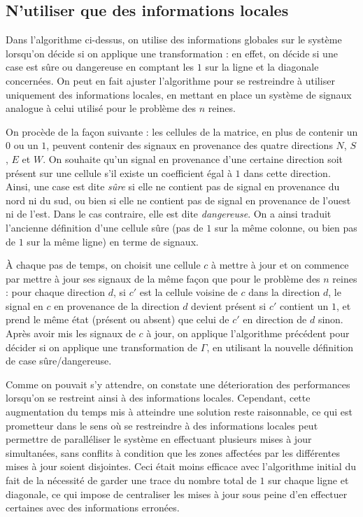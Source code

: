 \documentclass[11pt, openany]{article}
\begin{document}
\subsection*{N'utiliser que des informations locales}

Dans l'algorithme ci-dessus, on utilise des informations globales sur le système lorsqu'on décide si on applique une transformation : en effet, on décide si une case est sûre ou dangereuse en comptant les $1$ sur la ligne et la diagonale concernées. On peut en fait ajuster l'algorithme pour se restreindre à utiliser uniquement des informations locales, en mettant en place un système de signaux analogue à celui utilisé pour le problème des $n$ reines. 

On procède de la façon suivante : les cellules de la matrice, en plus de contenir un $0$ ou un $1$, peuvent contenir des signaux en provenance des quatre directions $N$, $S$, $E$ et $W$. On souhaite qu'un signal en provenance d'une certaine direction soit présent sur une cellule s'il existe un coefficient égal à $1$ dans cette direction. Ainsi, une case est dite \emph{sûre} si elle ne contient pas de signal en provenance du nord ni du sud, ou bien si elle ne contient pas de signal en provenance de l'ouest ni de l'est. Dans le cas contraire, elle est dite \emph{dangereuse}. On a ainsi traduit l'ancienne définition d'une cellule sûre (pas de $1$ sur la même colonne, ou bien pas de $1$ sur la même ligne) en terme de signaux.

À chaque pas de temps, on choisit une cellule $c$ à mettre à jour et on commence par mettre à jour ses signaux de la même façon que pour le problème des $n$ reines : pour chaque direction $d$, si $c'$ est la cellule voisine de $c$ dans la direction $d$, le signal en $c$ en provenance de la direction $d$ devient présent si $c'$ contient un $1$, et prend le même état (présent ou absent) que celui de $c'$ en direction de $d$ sinon.
Après avoir mis les signaux de $c$ à jour, on applique l'algorithme précédent pour décider si on applique une transformation de $\Gamma$, en utilisant la nouvelle définition de case sûre/dangereuse. 

Comme on pouvait s'y attendre, on constate une déterioration des performances lorsqu'on se restreint ainsi à des informations locales. Cependant, cette augmentation du temps mis à atteindre une solution reste raisonnable, ce qui est prometteur dans le sens où se restreindre à des informations locales peut permettre de paralléliser le système en effectuant plusieurs mises à jour simultanées, sans conflits à condition que les zones affectées par les différentes mises à jour soient disjointes. Ceci était moins efficace avec l'algorithme initial du fait de la nécessité de garder une trace du nombre total de $1$ sur chaque ligne et diagonale, ce qui impose de centraliser les mises à jour sous peine d'en effectuer certaines avec des informations erronées.


\nocite{Pom96}
\nocite{BahiC06}
\nocite{Fat13}



\end{document}
